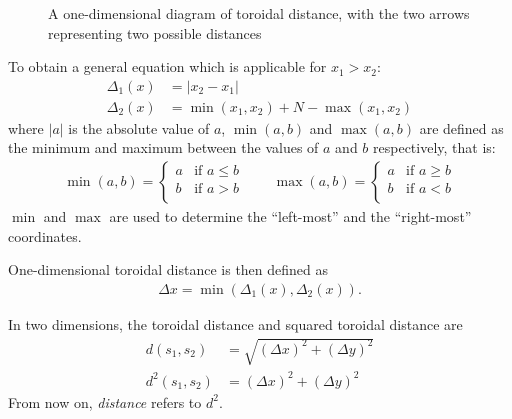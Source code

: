\begin{figure}[tpb]
    \centering
    \caption{A one-dimensional diagram of toroidal distance, with the two arrows representing two possible distances}%
    \label{fig:2distanceexample}
\end{figure}

To obtain a general equation which is applicable for $x_1>x_2$:
\begin{align*}
    \Delta_1(x)&=\lvert x_2-x_1 \rvert \\
    \Delta_2(x)&=\min{(x_1,x_2)}+N-\max{(x_1,x_2)}
\end{align*}
where $\lvert a\rvert$ is the absolute value of $a$, $\min{(a,b)}$ and $\max{(a,b)}$ are defined as the minimum and maximum between the values of $a$ and $b$ respectively, that is:
\begin{align*}
        \min{(a,b)}=
        \begin{cases}
            a&\text{if $a\leq b$}\\
            b&\text{if $a>b$}\\
        \end{cases}\qquad
        \max{(a,b)}=
        \begin{cases}
            a&\text{if $a\geq b$}\\
            b&\text{if $a<b$}\\
        \end{cases}
\end{align*}
$\min$ and $\max$ are used to determine the  ``left-most'' and the ``right-most'' coordinates.

One-dimensional toroidal distance is then defined as
\begin{align*}
    \Delta x=\min{(\Delta_1(x),\Delta_2(x))}.
\end{align*}

In two dimensions, the toroidal distance and squared toroidal distance are
\begin{align*}
    d(s_1,s_2)&=\sqrt{(\Delta x)^2+(\Delta y)^2} \\
    d^2(s_1,s_2)&=(\Delta x)^2+(\Delta y)^2
\end{align*}
From now on, \emph{distance} refers to $d^2$.

